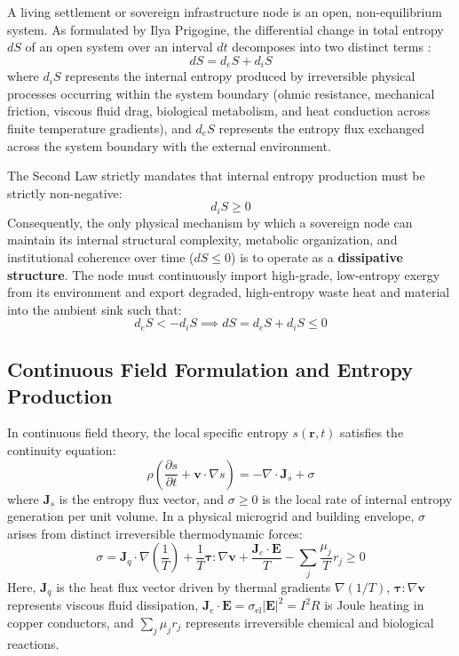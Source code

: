 A living settlement or sovereign infrastructure node is an open, non-equilibrium system. As formulated by Ilya Prigogine, the differential change in total entropy $dS$ of an open system over an interval $dt$ decomposes into two distinct terms \cite{prigogine1977time}:
\begin{equation}
dS = d_eS + d_iS
\label{eq:prigogine_decomposition}
\end{equation}
where $d_iS$ represents the internal entropy produced by irreversible physical processes occurring within the system boundary (ohmic resistance, mechanical friction, viscous fluid drag, biological metabolism, and heat conduction across finite temperature gradients), and $d_eS$ represents the entropy flux exchanged across the system boundary with the external environment.

The Second Law strictly mandates that internal entropy production must be strictly non-negative:
\begin{equation}
d_iS \ge 0
\label{eq:internal_entropy_production}
\end{equation}
Consequently, the only physical mechanism by which a sovereign node can maintain its internal structural complexity, metabolic organization, and institutional coherence over time ($dS \le 0$) is to operate as a \textbf{dissipative structure}. The node must continuously import high-grade, low-entropy exergy from its environment and export degraded, high-entropy waste heat and material into the ambient sink such that:
\begin{equation}
d_eS < -d_iS \implies dS = d_eS + d_iS \le 0
\label{eq:negentropy_condition}
\end{equation}

\subsection{Continuous Field Formulation and Entropy Production}
In continuous field theory, the local specific entropy $s(\mathbf{r}, t)$ satisfies the continuity equation:
\begin{equation}
\rho \left(\frac{\partial s}{\partial t} + \mathbf{v} \cdot \nabla s\right) = -\nabla \cdot \mathbf{J}_s + \sigma
\label{eq:entropy_field_continuity}
\end{equation}
where $\mathbf{J}_s$ is the entropy flux vector, and $\sigma \ge 0$ is the local rate of internal entropy generation per unit volume. In a physical microgrid and building envelope, $\sigma$ arises from distinct irreversible thermodynamic forces:
\begin{equation}
\sigma = \mathbf{J}_q \cdot \nabla\left(\frac{1}{T}\right) + \frac{1}{T} \boldsymbol{\tau} : \nabla\mathbf{v} + \frac{\mathbf{J}_e \cdot \mathbf{E}}{T} - \sum_j \frac{\mu_j}{T} r_j \ge 0
\label{eq:local_entropy_generation_sources}
\end{equation}
Here, $\mathbf{J}_q$ is the heat flux vector driven by thermal gradients $\nabla(1/T)$, $\boldsymbol{\tau} : \nabla\mathbf{v}$ represents viscous fluid dissipation, $\mathbf{J}_e \cdot \mathbf{E} = \sigma_{\mathrm{el}} |\mathbf{E}|^2 = I^2 R$ is Joule heating in copper conductors, and $\sum_j \mu_j r_j$ represents irreversible chemical and biological reactions.

